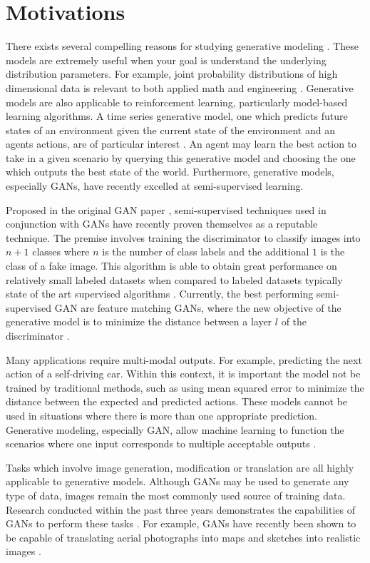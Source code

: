 \documentclass[11pt]{article}
\begin{document}
\section{Motivations}
There exists several compelling reasons for studying generative modeling \citep{2017arXiv170100160G}. These models are extremely useful when your goal is understand the underlying distribution parameters. For example, joint probability distributions of high dimensional data is relevant to both applied math and engineering \citep{2017arXiv170100160G}. Generative models are also applicable to reinforcement learning, particularly model-based learning algorithms. A time series generative model, one which predicts future states of an environment given the current state of the environment and an agents actions, are of particular interest \citep{2017arXiv170100160G}. An agent may learn the best action to take in a given scenario by querying this generative model and choosing the one which outputs the best state of the world. Furthermore, generative models, especially GANs, have recently excelled at semi-supervised learning.

Proposed in the original GAN paper \citep{2014arXiv1406.2661G}, semi-supervised techniques used in conjunction with GANs have recently proven themselves as a reputable technique. The premise involves training the discriminator to classify images into $n + 1$ classes where $n$ is the number of class labels and the additional $1$ is the class of a fake image. This algorithm is able to obtain great performance on relatively small labeled datasets when compared to labeled datasets typically state of the art supervised algorithms \citep{2017arXiv170100160G}. Currently, the best performing semi-supervised GAN are feature matching GANs, where the new objective of the generative model is to minimize the distance between a layer $l$ of the discriminator \citep{2016arXiv160603498S}.

Many applications require multi-modal outputs. For example, predicting the next action of a self-driving car. Within this context, it is important the model not be trained by traditional methods, such as using mean squared error to minimize the distance between the expected and predicted actions. These models cannot be used in situations where there is more than one appropriate prediction. Generative modeling, especially GAN, allow machine learning to function the scenarios where one input corresponds to multiple acceptable outputs \citep{2017arXiv170100160G}.

Tasks which involve image generation, modification or translation are all highly applicable to generative models. Although GANs may be used to generate any type of data, images remain the most commonly used source of training data. Research conducted within the past three years demonstrates the capabilities of GANs to perform these tasks \citep{2017arXiv170100160G, 2016arXiv161102200T, 2014arXiv1411.1784M}. For example, GANs have recently been shown to be capable of translating aerial photographs into maps and sketches into realistic images \citep{2017arXiv170100160G}.
\end{document}
